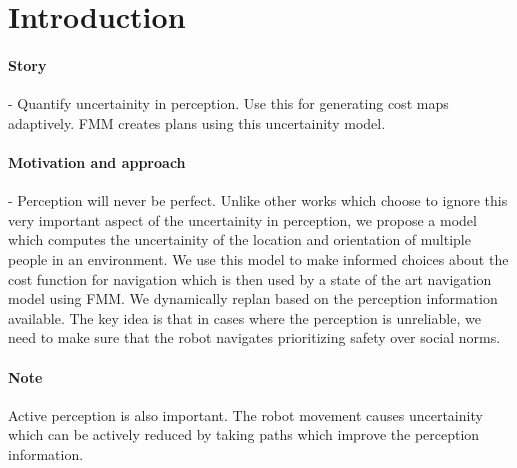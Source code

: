 \section{Introduction}

\paragraph{Story}  - Quantify uncertainity in perception. Use this for generating cost maps adaptively. FMM creates plans using this uncertainity model.

\paragraph{Motivation and approach} - Perception will never be perfect. Unlike other works which choose to ignore this very important aspect of the uncertainity in perception, we propose a model which computes the uncertainity of the location and orientation of multiple people in an environment. We use this model to make informed choices about the cost function for navigation which is then used by a state of the art navigation model using FMM. We dynamically replan based on the perception information available. The key idea is that in cases where the perception is unreliable, we need to make sure that the robot navigates prioritizing safety over social norms.
\paragraph{Note} Active perception is also important. The robot movement causes uncertainity which can be actively reduced by taking paths which improve the perception information.
